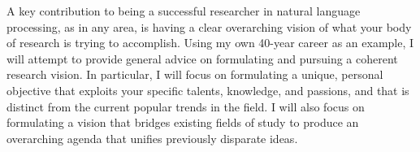 A key contribution to being a successful researcher in natural language processing, as in any area, is having a clear overarching vision of what your body of research is trying to accomplish. Using my own 40-year career as an example, I will attempt to provide general advice on formulating and pursuing a coherent research vision.   In particular, I will focus on formulating a unique, personal objective that exploits your specific talents, knowledge, and passions, and that is distinct from the current popular trends in the field.  I will also focus on formulating a vision that bridges existing fields of study to produce an overarching agenda that unifies previously disparate ideas.